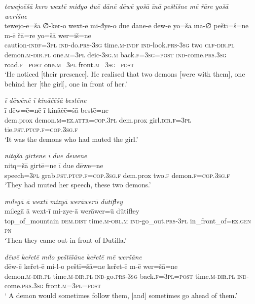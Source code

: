 \ea \label{ŽP.176}
\textit{tewejoēšā kero wextē miđyo duē dānē dēwē yošā īnā peštīšne mē řāre yošā werišne} \\ 
\gll tewejo-ē=šā ∅-ker-o wext-ē mi-đye-o duē dāne-ē dēw-ē yo=šā īnā-∅ peštī=š=ne m-ē řā=re yo=šā wer=iš=ne \\ 
 caution\textsc{-indf}\textsc{=3pl} \textsc{ind-}do\textsc{.prs}\textsc{-3sg} time\textsc{.m}\textsc{-indf} \textsc{ind-}look\textsc{.prs}\textsc{-3sg} two \textsc{clf}\textsc{-dir}\textsc{.pl} demon\textsc{.m}\textsc{-dir}\textsc{.pl} one\textsc{.m}\textsc{=3pl} deic\textsc{-3sg}\textsc{.m} back\textsc{.f}\textsc{=3sg}\textsc{=\textsc{post}} \textsc{ind-}come\textsc{.prs}\textsc{.3sg} road\textsc{.f}\textsc{=\textsc{post}} one\textsc{.m}\textsc{=3pl} front\textsc{.m}\textsc{=3sg}\textsc{=\textsc{post}} \\ 
\glt `He noticed [their presence]. He realised that two demons [were with them], one behind her [the girl], one in front of her.'
\z 
 
\ea \label{ŽP.177}
\textit{ī dēwēnē ī kināčēšā bestēne} \\ 
\gll ī dēw=ē=nē ī kināčē=šā bestē=ne \\ 
 dem.prox demon\textsc{.m}\textsc{=ez}.\textsc{attr}\textsc{=cop}\textsc{.3pl} dem.prox girl\textsc{.dir}\textsc{.f}\textsc{=3pl} tie\textsc{.pst}\textsc{.ptcp}\textsc{.f}\textsc{=cop}\textsc{.3sg}\textsc{.f} \\ 
\glt `It was the demons who had muted the girl.'
\z 
 
\ea \label{ŽP.178}
\textit{nitqšā girtēne ī due dēwene} \\ 
\gll nitq=šā girtē=ne ī due dēwe=ne \\ 
 speech\textsc{=3pl} grab\textsc{.pst}\textsc{.ptcp}\textsc{.f}\textsc{=cop}\textsc{.3sg}\textsc{.f} dem.prox two\textsc{.f} demon\textsc{.f}\textsc{=cop}\textsc{.3sg}\textsc{.f} \\ 
\glt `They had muted her speech, these two demons.'
\z 
 
\ea \label{ŽP.187}
\textit{milegā ā wextī mizyā werāwerū dūtifɫey} \\ 
\gll milegā ā wext-ī mi-zye-ā werāwer=ū dūtifɫey \\ 
 top\_of\_mountain \textsc{dem.dist} time\textsc{.m}\textsc{-obl}\textsc{.m} \textsc{ind-}go\_out\textsc{.prs}\textsc{-3pl} in\_front\_of\textsc{\textsc{=ez.gen}} \textsc{pn} \\ 
\glt `Then they came out in front of  Dutifla.'
\z 
 
\ea \label{ŽP.192}
\textit{dēwē keřetē milo peštīšāne keřetē mē weršāne} \\ 
\gll dēw-ē keřet-ē mi-l-o peštī=šā=ne keřet-ē m-ē wer=šā=ne \\ 
 demon\textsc{.m}\textsc{-dir}\textsc{.pl} time\textsc{.m}\textsc{-dir}\textsc{.pl} \textsc{ind-}go\textsc{.prs}\textsc{-3sg} back\textsc{.f}\textsc{=3pl}\textsc{=\textsc{post}} time\textsc{.m}\textsc{-dir}\textsc{.pl} \textsc{ind-}come\textsc{.prs}\textsc{.3sg} front\textsc{.m}\textsc{=3pl}\textsc{=\textsc{post}} \\ 
\glt ` A demon would sometimes follow them, [and] sometimes go ahead of them.'
\z 
 
